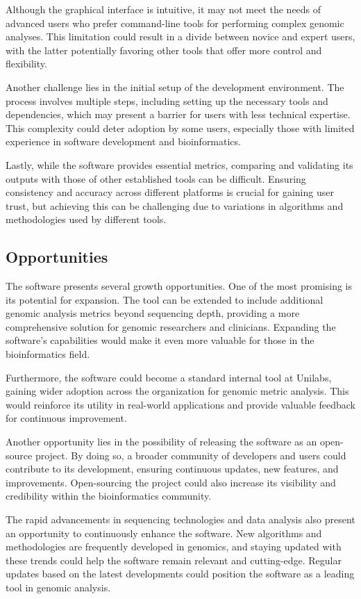 Although the graphical interface is intuitive, it may not meet the needs of advanced users who prefer command-line tools for performing complex genomic analyses. This limitation could result in a divide between novice and expert users, with the latter potentially favoring other tools that offer more control and flexibility.

Another challenge lies in the initial setup of the development environment. The process involves multiple steps, including setting up the necessary tools and dependencies, which may present a barrier for users with less technical expertise. This complexity could deter adoption by some users, especially those with limited experience in software development and bioinformatics.

Lastly, while the software provides essential metrics, comparing and validating its outputs with those of other established tools can be difficult. Ensuring consistency and accuracy across different platforms is crucial for gaining user trust, but achieving this can be challenging due to variations in algorithms and methodologies used by different tools.


\subsection{Opportunities}

The software presents several growth opportunities. One of the most promising is its potential for expansion. The tool can be extended to include additional genomic analysis metrics beyond sequencing depth, providing a more comprehensive solution for genomic researchers and clinicians. Expanding the software's capabilities would make it even more valuable for those in the bioinformatics field.

Furthermore, the software could become a standard internal tool at Unilabs, gaining wider adoption across the organization for genomic metric analysis. This would reinforce its utility in real-world applications and provide valuable feedback for continuous improvement.

Another opportunity lies in the possibility of releasing the software as an open-source project. By doing so, a broader community of developers and users could contribute to its development, ensuring continuous updates, new features, and improvements. Open-sourcing the project could also increase its visibility and credibility within the bioinformatics community.

The rapid advancements in sequencing technologies and data analysis also present an opportunity to continuously enhance the software. New algorithms and methodologies are frequently developed in genomics, and staying updated with these trends could help the software remain relevant and cutting-edge. Regular updates based on the latest developments could position the software as a leading tool in genomic analysis.

